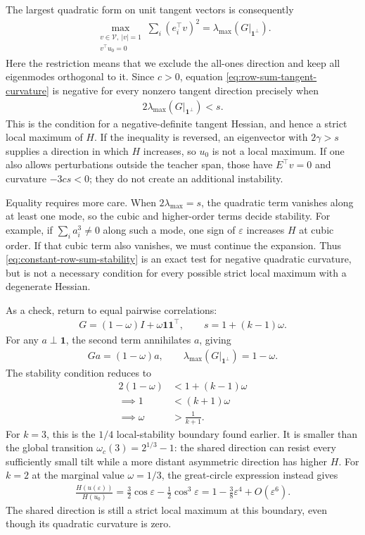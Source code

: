 \documentclass[11pt, reqno]{amsart}
\theoremstyle{notestyle}
\theoremstyle{defstyle}
\begin{document}
The largest quadratic form on unit tangent vectors is consequently
\begin{align*}
    \max_{\substack{v\in\mathcal V,\ |v|=1\\v^\top u_0=0}}
    \sum_i(e_i^\top v)^2
    =\lambda_{\max}\!\left(G\big|_{\mathbf 1^\perp}\right).
\end{align*}
Here the restriction means that we exclude the all-ones direction and keep all eigenmodes orthogonal to it.
Since $c>0$, equation \eqref{eq:row-sum-tangent-curvature} is negative for every nonzero tangent direction precisely when
\begin{align}\label{eq:constant-row-sum-stability}
    \boxed{2\lambda_{\max}\!\left(G\big|_{\mathbf 1^\perp}\right)<s.}
\end{align}
This is the condition for a negative-definite tangent Hessian, and hence a strict local maximum of $H$.
If the inequality is reversed, an eigenvector with $2\gamma>s$ supplies a direction in which $H$ increases, so $u_0$ is not a local maximum.
If one also allows perturbations outside the teacher span, those have $E^\top v=0$ and curvature $-3cs<0$; they do not create an additional instability.

Equality requires more care.
When $2\lambda_{\max}=s$, the quadratic term vanishes along at least one mode, so the cubic and higher-order terms decide stability.
For example, if $\sum_i a_i^3\ne0$ along such a mode, one sign of $\varepsilon$ increases $H$ at cubic order.
If that cubic term also vanishes, we must continue the expansion.
Thus \eqref{eq:constant-row-sum-stability} is an exact test for negative quadratic curvature, but is not a necessary condition for every possible strict local maximum with a degenerate Hessian.

As a check, return to equal pairwise correlations:
\begin{align*}
    G=(1-\omega)I+\omega\mathbf 1\mathbf 1^\top,
    \qquad s=1+(k-1)\omega.
\end{align*}
For any $a\perp\mathbf 1$, the second term annihilates $a$, giving
\begin{align*}
    Ga=(1-\omega)a,
    \qquad \lambda_{\max}\!\left(G\big|_{\mathbf 1^\perp}\right)=1-\omega.
\end{align*}
The stability condition reduces to
\begin{align*}
    2(1-\omega)&<1+(k-1)\omega \\
    \implies 1&<(k+1)\omega \\
    \implies \omega&>\frac{1}{k+1}.
\end{align*}
For $k=3$, this is the $1/4$ local-stability boundary found earlier.
It is smaller than the global transition $\omega_c(3)=2^{1/3}-1$: the shared direction can resist every sufficiently small tilt while a more distant asymmetric direction has higher $H$.
For $k=2$ at the marginal value $\omega=1/3$, the great-circle expression instead gives
\begin{align*}
    \frac{H(u(\varepsilon))}{H(u_0)}
    =\frac32\cos\varepsilon-\frac12\cos^3\varepsilon
    =1-\frac38\varepsilon^4+O(\varepsilon^6).
\end{align*}
The shared direction is still a strict local maximum at this boundary, even though its quadratic curvature is zero.
\end{document}
